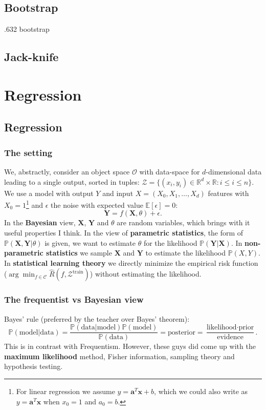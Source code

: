 \documentclass{article}
\begin{document}
\subsection{Bootstrap}
.632 bootstrap
\subsection{Jack-knife}

\section{Regression}


\subsection{Regression}
\subsubsection{The setting}
We, abstractly, consider an object space $\mathcal{O}$ with data-space for $d$-dimensional data leading to a single output, sorted in tuples: $\mathcal{Z}=\{(x_i,y_i)\in\mathbb{R}^d\times\mathbb{R}:i\leq i \leq n\}$. We use a model with output $Y$ and input $X=(X_0,X_1,\dots,X_d)$ features with $X_0=1$\footnote{For linear regression we assume $y=\mathbf{a}^T \mathbf{x}+b$, which we could also write as $y=\mathbf{a}^T\mathbf{x}$ when $x_0=1$ and $a_0=b$.} and $\epsilon$ the noise with expected value $\mathbb{E}[\epsilon]=0$:
\begin{equation}
    \mathbf{Y}=f(\mathbf{X},\theta)+\epsilon.
\end{equation}
In the \textbf{Bayesian} view, $\mathbf{X}$, $\mathbf{Y}$ and $\theta$ are random variables, which brings with it useful properties I think. In the view of \textbf{parametric statistics}, the form of $\mathbb{P}(\mathbf{X},\mathbf{Y}|\theta)$ is given, we want to estimate $\theta$ for the likelihood $\mathbb{P}(\mathbf{Y}|\mathbf{X})$. In \textbf{non-parametric statistics} we sample $\mathbf{X}$ and $\mathbf{Y}$ to estimate the likelihood $\mathbb{P}(X,Y)$. In \textbf{statistical learning theory} we directly minimize the empirical risk function ($\arg\min_{f\in\mathcal{C}}\hat{R}(f,\mathcal{Z}^\text{train})$) without estimating the likelihood.

\subsubsection{The frequentist vs Bayesian view}
Bayes' rule (preferred by the teacher over Bayes' theorem):
\begin{equation}
    \mathbb{P}(\text{model}|\text{data})=\frac{\mathbb{P}(\text{data}|\text{model})\mathbb{P}( \text{model} )  }{ \mathbb{P}(\text{data})   } = \text{posterior}=\frac{\text{likelihood}\cdot\text{prior}}{\text{evidence}}.
\end{equation}
This is in contrast with Frequentism. However, these guys did come up with the \textbf{maximum likelihood} method, Fisher information, sampling theory and hypothesis testing.
\end{document}
